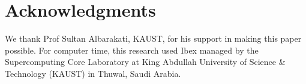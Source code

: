 \documentclass{article}
\begin{document}
\section*{Acknowledgments}
 We thank Prof Sultan Albarakati, KAUST, for his support in making this paper possible. For computer time, this research used Ibex managed by the Supercomputing Core Laboratory at King Abdullah University of Science \& Technology (KAUST) in Thuwal, Saudi Arabia.




\appendix






\end{document}
